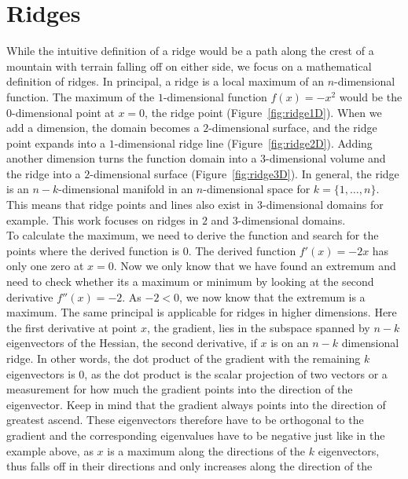 \section{Ridges}\label{sec:Ridges}

While the intuitive definition of a ridge would be a path along the
crest of a mountain with terrain falling off on either side, we focus on
a mathematical definition of ridges. In principal, a ridge is a local
maximum of an $n$-dimensional function. The maximum of the
$1$-dimensional function $f(x) = -x^2$ would be the $0$-dimensional
point at $x=0$, the ridge point (Figure~\ref{fig:ridge1D}). When we add
a dimension, the domain becomes a $2$-dimensional surface, and the ridge
point expands into a $1$-dimensional ridge line
(Figure~\ref{fig:ridge2D}). Adding another dimension turns the function
domain into a $3$-dimensional volume and the ridge into a
$2$-dimensional surface (Figure~\ref{fig:ridge3D}). In general, the
ridge is an $n-k$-dimensional manifold in an $n$-dimensional space for
$k=\{1, \dots, n\}$. This means that ridge points and lines also exist
in $3$-dimensional domains for example. This work focuses on ridges in
$2$ and $3$-dimensional domains.\\
To calculate the maximum, we need to derive the function and search for
the points where the derived function is $0$. The derived function
$f'(x)=-2x$ has only one zero at $x=0$. Now we only know that we have
found an extremum and need to check whether its a maximum or minimum by
looking at the second derivative $f''(x)=-2$. As $-2 < 0$, we now know
that the extremum is a maximum. The same principal is applicable for
ridges in higher dimensions. Here the first derivative at point $x$, the
gradient, lies in the subspace spanned by $n-k$ eigenvectors of the
Hessian, the second derivative, if $x$ is on an $n-k$ dimensional ridge.
In other words, the dot product of the gradient with the remaining $k$
eigenvectors is $0$, as the dot product is the scalar projection of two
vectors or a measurement for how much the gradient points into the
direction of the eigenvector. Keep in mind that the gradient always
points into the direction of greatest ascend. These eigenvectors
therefore have to be orthogonal to the gradient and the corresponding
eigenvalues have to be negative just like in the example above, as $x$
is a maximum along the directions of the $k$ eigenvectors, thus falls
off in their directions and only increases along the direction of the
